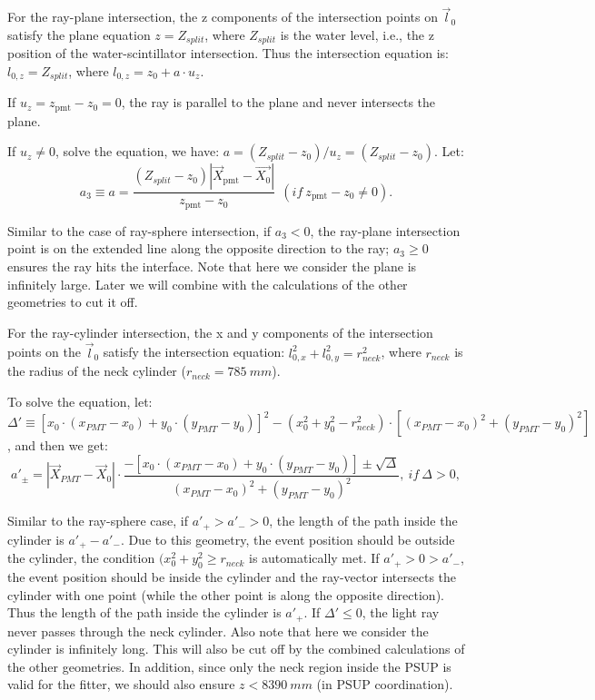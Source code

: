 For the ray-plane intersection, the z components of the intersection points on $\vec{l}_0$ satisfy the plane equation $z=Z_{split}$, where $Z_{split}$ is the water level, i.e., the z position of the water-scintillator intersection. Thus the intersection equation is:
$l_{0,z}=Z_{split}$, where $l_{0,z}=z_0+a\cdot u_z$.

If $u_z=z_\mathrm{pmt}-z_0=0$, the ray is parallel to the plane and never intersects the plane.

If $u_z\neq 0$, solve the equation, we have: $a=(Z_{split}-z_0)/u_z=(Z_{split}-z_0)$.
Let: 
\[
a_3 \equiv a = \frac{(Z_{split}-z_0)|\vec{X}_{\mathrm{pmt}}-\vec{X_0}|}{z_\mathrm{pmt}-z_0}~~(if ~z_\mathrm{pmt}-z_0\neq 0).
\]

Similar to the case of ray-sphere intersection, if $a_3<0$, the ray-plane intersection point is on the extended line along the opposite direction to the ray; $a_3 \geq 0$ ensures the ray hits the interface. Note that here we consider the plane is infinitely large. Later we will combine with the calculations of the other geometries to cut it off. 

For the ray-cylinder intersection, the x and y components of the intersection points on the $\vec l_0$ satisfy the intersection equation: $l^2_{0,x}+l^2_{0,y} = r^2_{neck}$, where $r_{neck}$ is the radius of the neck cylinder ($r_{neck}=785~mm$).

To solve the equation,  let: $\Delta'\equiv [x_0\cdot (x_{PMT}-x_0)+y_0\cdot(y_{PMT}-y_0)]^2 - ( x_0^2+y_0^2-r^2_{neck})\cdot [(x_{PMT}-x_0)^2+(y_{PMT}-y_0)^2]$, and then we get: 
\begin{equation}\label{eq:ray-cylinder}
a'_{\pm} = |\vec{X}_{PMT}-\vec{X}_0|\cdot\frac{-[x_0\cdot (x_{PMT}-x_0)+y_0\cdot(y_{PMT}-y_0)] \pm \sqrt\Delta }{(x_{PMT}-x_0)^2+(y_{PMT}-y_0)^2},~if~\Delta>0,
\end{equation}

Similar to the ray-sphere case, if $a'_{+}>a'_->0$, the length of the path inside the cylinder is $a'_+-a'_-$. Due to this geometry, the event position should be outside the cylinder, the condition $(x^2_0+y^2_0\geq r_{neck}$ is automatically met. If $a'_+>0>a'_-$, the event position should be inside the cylinder and the ray-vector intersects the cylinder with one point (while the other point is along the opposite direction). Thus the length of the path inside the cylinder is $a'_+$. If $\Delta'\leq0$, the light ray never passes through the neck cylinder. Also note that here we consider the cylinder is infinitely long. This will also be cut off by the combined calculations of the other geometries. In addition, since only the neck region inside the PSUP is valid for the fitter, we should also ensure $z<8390~mm$ (in PSUP coordination).

